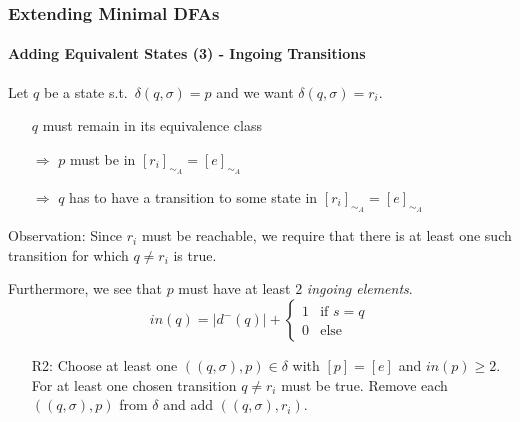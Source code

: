 \begin{frame}
	\frametitle{Extending Minimal DFAs}
	\framesubtitle{Adding Equivalent States (3) - Ingoing Transitions}
	Let $q$ be a state s.t.\ $\delta(q,\sigma)=p$ and we want $\delta(q,\sigma)=r_i$.
	\begin{itemize}
		\item[] $q$ must remain in its equivalence class
		
		\item[$\Rightarrow$] $p$ must be in $[r_i]_{\sim_A} = [e]_{\sim_A}$
		
		\item[$\Rightarrow$] $q$ has to have a transition to some state in $[r_i]_{\sim_A} = [e]_{\sim_A}$\pause
	\end{itemize}

	Observation: Since $r_i$ must be reachable, we require that there is at least one such transition for which $q \neq r_i$ is true.\pause
	
	\vspace{0.2cm}
	Furthermore, we see that $p$ must have at least $2$ \emph{ingoing elements}.
	\[
	in(q) = |d^-(q)| + \begin{cases}
	1 & \text{if } s = q\\
	0 & \text{else}
	\end{cases}
	\]\pause
	\begin{itemize}
		\item[R2:] Choose at least one $((q, \sigma), p) \in \delta$ with $[p] = [e]$ and $in(p) \geq 2$. For at least one chosen transition  $q\neq r_i$ must be true. Remove each $((q, \sigma), p)$ from $\delta$ and add $((q, \sigma), r_i)$.
	\end{itemize}
\end{frame}

